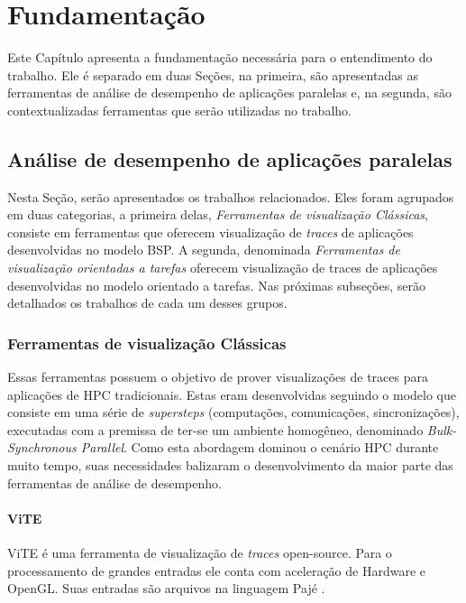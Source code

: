 
\chapter{Fundamentação} \label{ch:fundamentation}

Este Capítulo apresenta a fundamentação necessária para o entendimento do trabalho. 
Ele é separado em duas Seções, na primeira, são apresentadas as ferramentas de análise de
desempenho de aplicações paralelas e, na segunda, são contextualizadas ferramentas que
serão utilizadas no trabalho.

\section{Análise de desempenho de aplicações paralelas}

Nesta Seção, serão apresentados os trabalhos relacionados. Eles foram agrupados em duas
categorias, a primeira delas, \emph{
Ferramentas de visualização Clássicas}, consiste em ferramentas que oferecem visualização de \emph{traces} de aplicações desenvolvidas no modelo BSP. A segunda, denominada \emph{Ferramentas de visualização orientadas a tarefas} oferecem visualização de traces de aplicações desenvolvidas no modelo orientado a tarefas. Nas próximas subseções, serão detalhados os trabalhos de cada um desses grupos.

\subsection*{Ferramentas de visualização Clássicas}

Essas ferramentas possuem o objetivo de prover visualizações de traces para aplicações de HPC tradicionais. Estas eram desenvolvidas
seguindo o modelo que consiste em uma série de \emph{supersteps} (computações, comunicações, sincronizações), executadas com a premissa de ter-se um ambiente homogêneo, denominado \emph{Bulk-Synchronous Parallel}. Como esta abordagem  dominou o cenário HPC durante muito tempo, suas necessidades
balizaram o desenvolvimento da maior parte das ferramentas de análise de desempenho.

\subsubsection*{ViTE}
ViTE \cite{ref:vite} é uma ferramenta de visualização de \emph{traces} open-source. Para o processamento de grandes entradas ele conta com aceleração de Hardware e OpenGL. Suas entradas são arquivos na linguagem Pajé \cite{ref:paje}.


